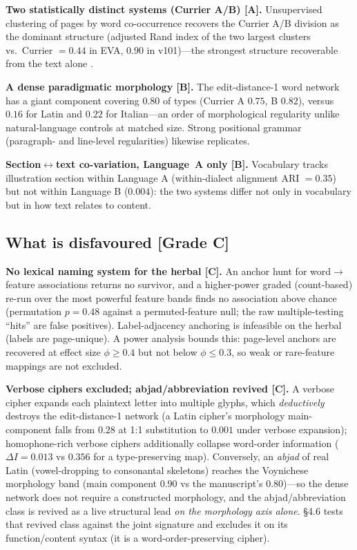 \documentclass[11pt]{article}
\newcommand{\grade}[1]{{\small\textbf{[#1]}}}
\begin{document}
\textbf{Two statistically distinct systems (Currier A/B) \grade{A}.} Unsupervised
clustering of pages by word co-occurrence recovers the Currier A/B division as the
dominant structure (adjusted Rand index of the two largest clusters vs.\ Currier
$=0.44$ in EVA, $0.90$ in v101)---the strongest structure recoverable from the text
alone \citep{montemurro2013keywords}.

\textbf{A dense paradigmatic morphology \grade{B}.} The edit-distance-1 word network
has a giant component covering $0.80$ of types (Currier A $0.75$, B $0.82$), versus
$0.16$ for Latin and $0.22$ for Italian---an order of morphological regularity unlike
natural-language controls at matched size. Strong positional grammar (paragraph- and
line-level regularities) likewise replicates.

\textbf{Section$\leftrightarrow$text co-variation, Language~A only \grade{B}.}
Vocabulary tracks illustration section within Language A (within-dialect alignment ARI
$=0.35$) but not within Language B ($0.004$): the two systems differ not only in
vocabulary but in how text relates to content.

\subsection{What is disfavoured \grade{Grade C}}
\textbf{No lexical naming system for the herbal \grade{C}.} An anchor hunt for
word$\rightarrow$feature associations returns no survivor, and a higher-power graded
(count-based) re-run over the most powerful feature bands finds no association above
chance (permutation $p=0.48$ against a permuted-feature null; the raw multiple-testing
``hits'' are false positives). Label-adjacency anchoring is infeasible on the herbal
(labels are page-unique). A power analysis bounds this: page-level anchors are
recovered at effect size $\phi\geq 0.4$ but not below $\phi\leq 0.3$, so weak or
rare-feature mappings are not excluded.

\textbf{Verbose ciphers excluded; abjad/abbreviation revived \grade{C}.} A verbose
cipher expands each plaintext letter into multiple glyphs, which \emph{deductively}
destroys the edit-distance-1 network (a Latin cipher's morphology main-component falls
from $0.28$ at 1:1 substitution to $0.001$ under verbose expansion); homophone-rich
verbose ciphers additionally collapse word-order information ($\Delta I = 0.013$ vs
$0.356$ for a type-preserving map). Conversely, an \emph{abjad} of real Latin
(vowel-dropping to consonantal skeletons) reaches the Voynichese morphology band
(main component $0.90$ vs the manuscript's $0.80$)---so the dense network does not
require a constructed morphology, and the abjad/abbreviation class
\citep{hauer2016decoding} is revived as a live structural lead \emph{on the morphology
axis alone}. \S4.6 tests that revived class against the joint signature and
excludes it on its function/content syntax (it is a word-order-preserving cipher).
\end{document}
